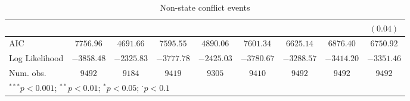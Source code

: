 \begin{sidewaystable}
\begin{center}
{\begin{tabular}{l c c c c c c c c}
                               &               &               &               &               &                &               &                & $(0.04)$       \\
\midrule
AIC                            & $7756.96$     & $4691.66$     & $7595.55$     & $4890.06$     & $7601.34$      & $6625.14$     & $6876.40$      & $6750.92$      \\
Log Likelihood                 & $-3858.48$    & $-2325.83$    & $-3777.78$    & $-2425.03$    & $-3780.67$     & $-3288.57$    & $-3414.20$     & $-3351.46$     \\
Num. obs.                      & $9492$        & $9184$        & $9419$        & $9305$        & $9410$         & $9492$        & $9492$         & $9492$         \\
\bottomrule
\multicolumn{9}{l}{\scriptsize{$^{***}p<0.001$; $^{**}p<0.01$; $^{*}p<0.05$; $^{\cdot}p<0.1$}}
\end{tabular}
}
\caption{Non-state conflict events}
\label{zorg3}
\end{center}
\end{sidewaystable}
